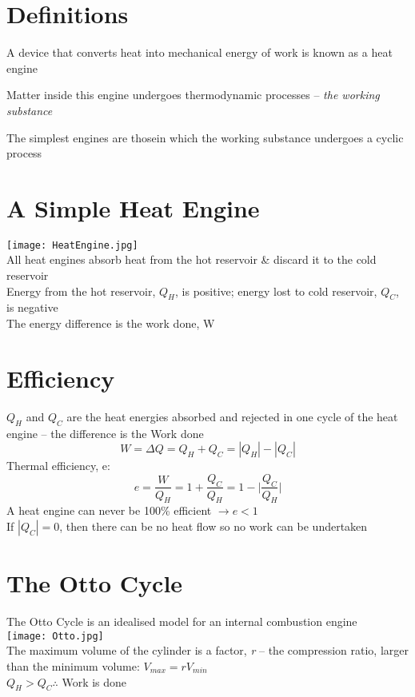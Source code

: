 \documentclass[a4paper, 11pt, fleqn, normalem]{report}
\begin{document}
\section*{Definitions}
A device that converts heat into mechanical energy of work is known as a heat engine

Matter inside this engine undergoes thermodynamic processes -- \emph{the working substance}

The simplest engines are thosein which the working substance undergoes a cyclic process

\section*{A Simple Heat Engine}
\texttt{[image: HeatEngine.jpg]} \\
All heat engines absorb heat from the hot reservoir \& discard it to the cold reservoir \\
Energy from the hot reservoir, $Q_{H}$, is positive; energy lost to cold reservoir, $Q_{C}$, is negative \\
The energy difference is the work done, W

\section*{Efficiency}
$Q_{H}$ and $Q_{C}$ are the heat energies absorbed and rejected in one cycle of the heat engine -- the difference is the Work done
\begin{equation*}
	W = {\Delta}Q = Q_{H} + Q_{C} = |Q_{H}| - |Q_{C}|
\end{equation*}
Thermal efficiency, e:
\begin{equation*}
	e = \frac{W}{Q_{H}} = 1 + \frac{Q_{C}}{Q_{H}} = 1 - \bigg|\frac{Q_{C}}{Q_{H}}\bigg|
\end{equation*}
A heat engine can never be 100\% efficient $\rightarrow e < 1$ \\
If $|Q_{C}| = 0$, then there can be no heat flow so no work can be undertaken

\section*{The Otto Cycle}
The Otto Cycle is an idealised model for an internal combustion engine \\
\texttt{[image: Otto.jpg]} \\
The maximum volume of the cylinder is a factor, \emph{r} -- the compression ratio, larger than the minimum volume: $V_{max} = rV_{min}$ \\
$Q_{H} > Q_{C} \therefore$ Work is done
\end{document}
